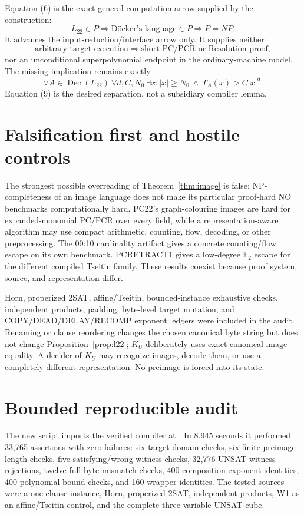 \documentclass[11pt]{article}
\newcommand{\Ltwo}{L_{22}}
\begin{document}
Equation (6) is the exact general-computation arrow supplied by the
construction:
\[
  \Ltwo\in P\Longrightarrow\text{D\"ocker's language}\in P
  \Longrightarrow P=NP.                                  \tag{7}
\]
It advances the input-reduction/interface arrow only.  It supplies neither
\[
 \text{arbitrary target execution}\Longrightarrow
 \text{short PC/PCR or Resolution proof},                 \tag{8}
\]
nor an unconditional superpolynomial endpoint in the ordinary-machine model.
The missing implication remains exactly
\[
 \forall A\in\operatorname{Dec}(\Ltwo)\ \forall d,C,N_0\ \exists x:
 |x|\ge N_0\ \land\ T_A(x)>C|x|^d.                       \tag{9}
\]
Equation (9) is the desired separation, not a subsidiary compiler lemma.

\section{Falsification first and hostile controls}
The strongest possible overreading of Theorem~\ref{thm:image} is false:
NP-completeness of an image language does not make its particular proof-hard
NO benchmarks computationally hard.  PC22's graph-colouring images are hard
for expanded-monomial PC/PCR over every field, while a representation-aware
algorithm may use compact arithmetic, counting, flow, decoding, or other
preprocessing.  The 00:10 cardinality artifact gives a concrete counting/flow
escape on its own benchmark.  PCRETRACT1 gives a low-degree $\mathbb F_2$
escape for the different compiled Tseitin family.  These results coexist
because proof system, source, and representation differ.

Horn, properized 2SAT, affine/Tseitin, bounded-instance exhaustive checks,
independent products, padding, byte-level target mutation, and
COPY/DEAD/DELAY/RECOMP exponent ledgers were included in the audit.  Renaming
or clause reordering changes the chosen canonical byte string but does not
change Proposition~\ref{prop:l22}; $K_U$ deliberately uses exact canonical
image equality.  A decider of $K_U$ may recognize images, decode them, or use a
completely different representation.  No preimage is forced into its state.

\section{Bounded reproducible audit}
The new script
 imports the verified
compiler at .  In 8.945 seconds it
performed 33,765 assertions with zero failures: six target-domain checks, six
finite preimage-length checks, five satisfying/wrong-witness checks, 32,776
UNSAT-witness rejections, twelve full-byte mismatch checks, 400 composition
exponent identities, 400 polynomial-bound checks, and 160 wrapper identities.
The tested sources were a one-clause instance, Horn, properized 2SAT,
independent products, W1 as an affine/Tseitin control, and the complete
three-variable UNSAT cube.
\end{document}

